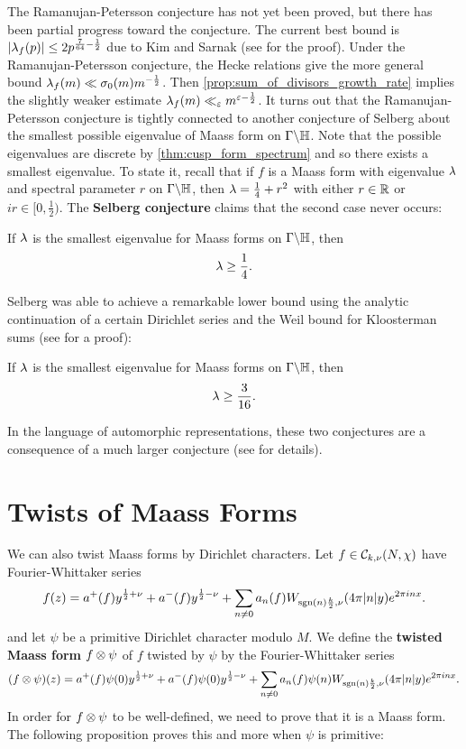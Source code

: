     The Ramanujan-Petersson conjecture has not yet been proved, but there has been partial progress toward the conjecture. The current best bound is $|\lambda_{f}(p)| \le 2p^{\frac{7}{64}-\frac{1}{2}}$ due to Kim and Sarnak (see \cite{kim2003functoriality} for the proof). Under the Ramanujan-Petersson conjecture, the Hecke relations give the more general bound $\lambda_{f}(m) \ll \sigma_{0}(m)m^{-\frac{1}{2}}$. Then \cref{prop:sum_of_divisors_growth_rate} implies the slightly weaker estimate $\lambda_{f}(m) \ll_{\varepsilon} m^{\varepsilon-\frac{1}{2}}$. It turns out that the Ramanujan-Petersson conjecture is tightly connected to another conjecture of Selberg about the smallest possible eigenvalue of Maass form on $\Gamma\backslash\mathbb{H}$. Note that the possible eigenvalues are discrete by \cref{thm:cusp_form_spectrum} and so there exists a smallest eigenvalue. To state it, recall that if $f$ is a Maass form with eigenvalue $\lambda$ and spectral parameter $r$ on $\Gamma\backslash\mathbb{H}$, then $\lambda = \frac{1}{4}+r^{2}$ with either $r \in \mathbb{R}$ or $ir \in [0,\frac{1}{2})$. The \textbf{Selberg conjecture} claims that the second case never occurs:

    \begin{conjecture}
      If $\lambda$ is the smallest eigenvalue for Maass forms on $\Gamma\backslash\mathbb{H}$, then
      \[
        \lambda \ge \frac{1}{4}.
      \]
    \end{conjecture}

    Selberg was able to achieve a remarkable lower bound using the analytic continuation of a certain Dirichlet series and the Weil bound for Kloosterman sums (see \cite{iwaniec2002spectral} for a proof):

    \begin{theorem}
      If $\lambda$ is the smallest eigenvalue for Maass forms on $\Gamma\backslash\mathbb{H}$, then
      \[
        \lambda \ge \frac{3}{16}.
      \]
    \end{theorem}

    In the language of automorphic representations, these two conjectures are a consequence of a much larger conjecture (see \cite{blomer2013role} for details).
  \section{Twists of Maass Forms}
    We can also twist Maass forms by Dirichlet characters. Let $f \in \mathcal{C}_{k,\nu}(N,\chi)$ have Fourier-Whittaker series
    \[
      f(z) = a^{+}(f)y^{\frac{1}{2}+\nu}+a^{-}(f)y^{\frac{1}{2}-\nu}+\sum_{n \neq 0}a_{n}(f)W_{\operatorname{\mathrm{sgn}}(n)\frac{k}{2},\nu}(4\pi|n|y)e^{2\pi inx}.
    \]
    and let $\psi$ be a primitive Dirichlet character modulo $M$. We define the \textbf{twisted Maass form} $f \otimes \psi$ of $f$ twisted by $\psi$ by the Fourier-Whittaker series
    \[
      (f \otimes \psi)(z) = a^{+}(f)\psi(0)y^{\frac{1}{2}+\nu}+a^{-}(f)\psi(0)y^{\frac{1}{2}-\nu}+\sum_{n \neq 0}a_{n}(f)\psi(n)W_{\operatorname{\mathrm{sgn}}(n)\frac{k}{2},\nu}(4\pi|n|y)e^{2\pi inx}.
    \]
    In order for $f \otimes \psi$ to be well-defined, we need to prove that it is a Maass form. The following proposition proves this and more when $\psi$ is primitive:

